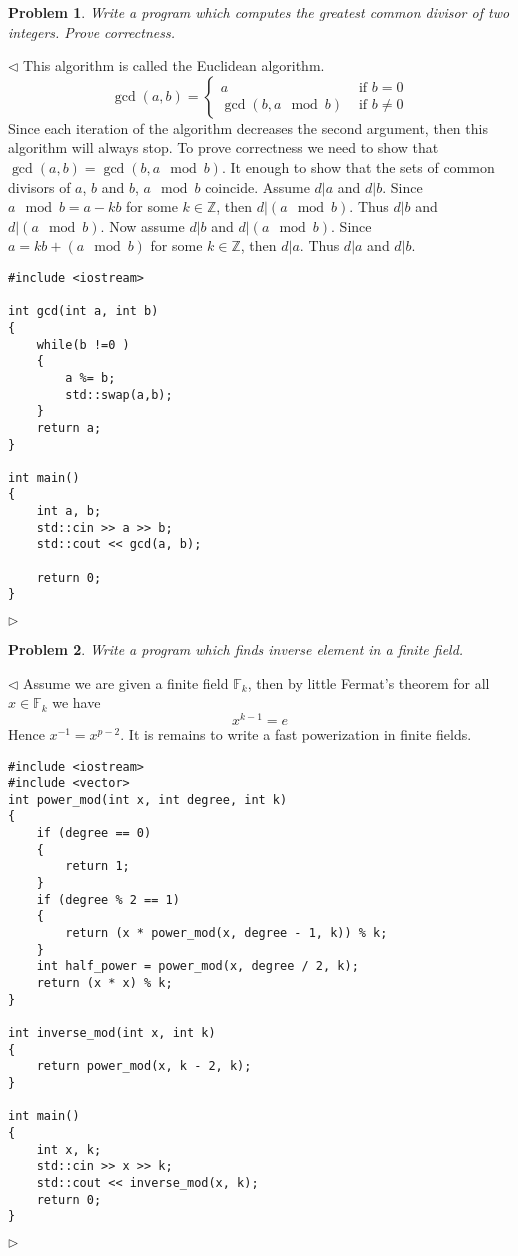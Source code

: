 \documentclass[12pt]{article}
\newtheorem{problem}{Problem}[subsection]
\newenvironment{solution}{\par $\triangleleft$}{$\triangleright$}
\begin{document}
\begin{problem} Write a program which computes the greatest common divisor of
two integers. Prove correctness.
\end{problem}
\begin{solution} This algorithm is called the Euclidean algorithm.
    $$
        \gcd(a,b)=\begin{cases}
            a                &
            \mbox{ if } b=0    \\
            \gcd(b, a\mod b) &
            \mbox{ if } b\neq 0
        \end{cases}
    $$
    Since each iteration of the algorithm decreases the second argument, then
    this algorithm will always stop. To prove correctness we need to show that
    $\gcd(a,b)=\gcd(b, a\mod b)$. It enough to show that the sets of common
    divisors of $a$, $b$ and $b$, $a\mod b$ coincide. Assume $d|a$ and $d|b$.
    Since $a\mod b=a-kb$ for some $k\in\mathbb{Z}$, then $d|(a\mod b)$. Thus
    $d|b$ and $d|(a\mod b)$. Now  assume $d|b$ and $d|(a\mod b)$. Since
    $a=kb+(a\mod b)$ for some $k\in\mathbb{Z}$, then $d|a$. Thus $d|a$ and
    $d|b$.
    \begin{verbatim}
#include <iostream>

int gcd(int a, int b)
{
    while(b !=0 )
    {
        a %= b;
        std::swap(a,b);
    }
    return a;
}

int main()
{
    int a, b;
    std::cin >> a >> b;
    std::cout << gcd(a, b);

    return 0;
}
    \end{verbatim}
\end{solution}

\begin{problem} Write a program which finds inverse element in a finite field.
\end{problem}
\begin{solution} Assume we are given a finite field $\mathbb{F}_k$, then by
    little Fermat’s theorem for all $x\in \mathbb{F}_k$ we have
    $$
        x^{k-1}=e
    $$
    Hence $x^{-1}=x^{p-2}$. It is remains to write a fast powerization in finite
    fields.
    \begin{verbatim}
#include <iostream>
#include <vector>
int power_mod(int x, int degree, int k)
{
    if (degree == 0)
    {
        return 1;
    }
    if (degree % 2 == 1)
    {
        return (x * power_mod(x, degree - 1, k)) % k;
    }
    int half_power = power_mod(x, degree / 2, k);
    return (x * x) % k;
}

int inverse_mod(int x, int k)
{
    return power_mod(x, k - 2, k);
}

int main()
{
    int x, k;
    std::cin >> x >> k;
    std::cout << inverse_mod(x, k);
    return 0;
}
    \end{verbatim}
\end{solution}
\end{document}
